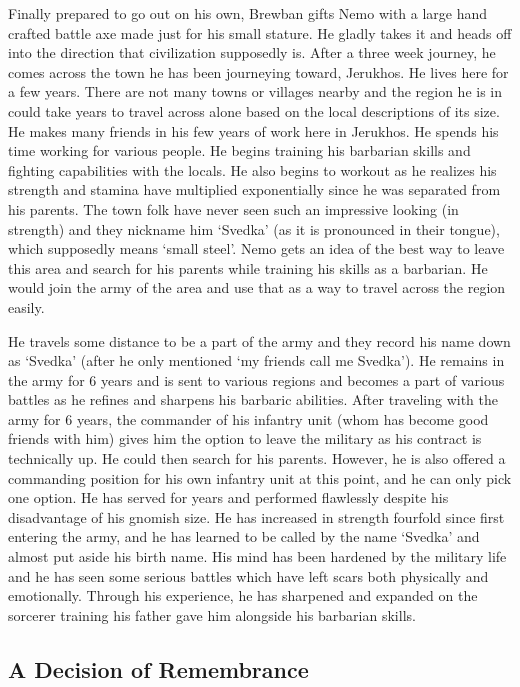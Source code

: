 \documentclass[letterpaper,10pt,twoside,twocolumn,openany]{book}
\begin{document}
Finally prepared to go out on his own, Brewban gifts Nemo with a large hand crafted battle axe made just for his small stature. He gladly takes it and heads off into the direction that civilization supposedly is. After a three week journey, he comes across the town he has been journeying toward, Jerukhos. He lives here for a few years. There are not many towns or villages nearby and the region he is in could take years to travel across alone based on the local descriptions of its size. He makes many friends in his few years of work here in Jerukhos. He spends his time working for various people. He begins training his barbarian skills and fighting capabilities with the locals. He also begins to workout as he realizes his strength and stamina have multiplied exponentially since he was separated from his parents. The town folk have never seen such an impressive looking (in strength) and they nickname him `Svedka' (as it is pronounced in their tongue), which supposedly means `small steel'. Nemo gets an idea of the best way to leave this area and search for his parents while training his skills as a barbarian. He would join the army of the area and use that as a way to travel across the region easily. 

He travels some distance to be a part of the army and they record his name down as `Svedka' (after he only mentioned `my friends call me Svedka'). He remains in the army for 6 years and is sent to various regions and becomes a part of various battles as he refines and sharpens his barbaric abilities. After traveling with the army for 6 years, the commander of his infantry unit (whom has become good friends with him) gives him the option to leave the military as his contract is technically up. He could then search for his parents. However, he is also offered a commanding position for his own infantry unit at this point, and he can only pick one option. He has served for years and performed flawlessly despite his disadvantage of his gnomish size. He has increased in strength fourfold since first entering the army, and he has learned to be called by the name `Svedka' and almost put aside his birth name. His mind has been hardened by the military life and he has seen some serious battles which have left scars both physically and emotionally.  Through his experience, he has sharpened and expanded on the sorcerer training his father gave him alongside his barbarian skills.

\subsection{A Decision of Remembrance}
\end{document}

